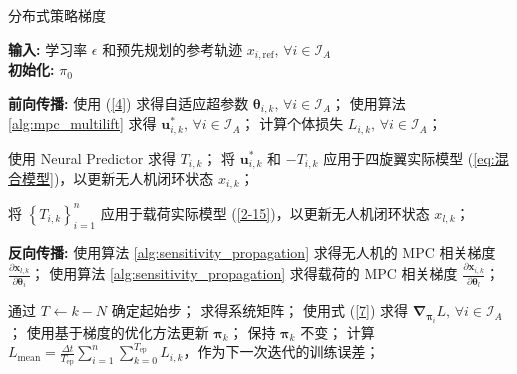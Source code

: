 \documentclass[lang=chs, degree=master, blindreview=true, winfonts=true]{yanputhesis}
\begin{document}
\begin{algorithm}[h]
    \caption{分布式策略梯度}
    \label{alg:distributed_pg}
    \textbf{输入:} 学习率 $\epsilon$ 和预先规划的参考轨迹 $x_{i,{\text{ref}}}, \, \forall i \in \mathcal{I}_A$\\
    \textbf{初始化:} $\pi_0$
    
    \begin{algorithmic}[1]
                \State \textbf{前向传播:}
                \State 使用 (\ref{4}) 求得自适应超参数 $\bm{\theta}_{i,k}, \, \forall i \in \mathcal{I}_A$；
                \State 使用算法 \ref{alg:mpc_multilift} 求得 $\bm{u}_{i,k}^{\ast}, \, \forall i \in \mathcal{I}_A$；
                \State 计算个体损失 $L_{i,k}, \, \forall i \in \mathcal{I}_A$；
                
                    \State 使用 Neural Predictor 求得 $T_{i,k}$；
                    \State 将 $\bm{u}_{i,k}^{\ast}$ 和 $-T_{i,k}$ 应用于四旋翼实际模型 (\ref{eq:混合模型})，以更新无人机闭环状态 $x_{i,k}$；
                \EndFor
                
                \State 将 $\left\{ T_{i,k} \right\}_{i=1}^n$ 应用于载荷实际模型 (\ref{2-15})，以更新无人机闭环状态 $x_{l,k}$；
                
                \State \textbf{反向传播:}
                    \State 使用算法 \ref{alg:sensitivity_propagation} 求得无人机的 MPC 相关梯度 $\frac{\partial \bm{x}_{l,k}}{\partial \bm{\theta}_i}$；
                    \State 使用算法 \ref{alg:sensitivity_propagation} 求得载荷的 MPC 相关梯度 $\frac{\partial \bm{x}_{i,k}}{\partial \bm{\theta}_l}$；
                \EndFor
                
                    \State 通过 $T_{\text{}} \gets k - N$ 确定起始步；
                    \State 求得系统矩阵；
                    \State 使用式 (\ref{7}) 求得 $\bm{\nabla}_{\bm{\pi}_i} L, \, \forall i \in \mathcal{I}_A$；
                    \State 使用基于梯度的优化方法更新 $\bm{\pi}_k$；
                \Else
                    \State 保持 $\bm{\pi}_k$ 不变；
                \EndIf
            \EndFor
            \State 计算 $L_{\text{mean}} = \frac{\Delta t}{T_{\text{ep}}} \sum_{i=1}^n \sum_{k=0}^{T_{\text{ep}}} L_{i,k}$，作为下一次迭代的训练误差；
        \EndWhile
    \end{algorithmic}
\end{algorithm}
\end{document}
